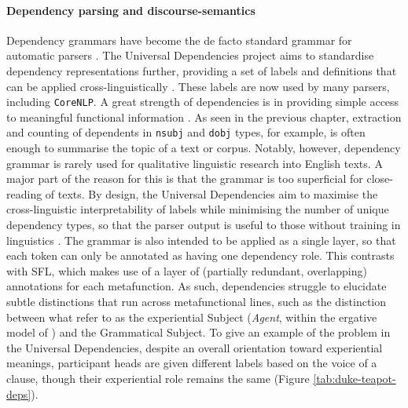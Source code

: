 \paragraph{Dependency parsing and discourse-semantics}

Dependency grammars have become the de facto standard grammar for automatic parsers \cite{marneffe_ud_2014}. The Universal Dependencies project aims to standardise dependency representations further, providing a set of labels and definitions that can be applied cross-linguistically \cite{nivre_towards_2015}. These labels are now used by many parsers, including \texttt{CoreNLP}. A great strength of dependencies is in providing simple access to meaningful functional information \cite{de2008stanford}. As seen in the previous chapter, extraction and counting of dependents in \texttt{nsubj} and \texttt{dobj} types, for example, is often enough to summarise the topic of a text or \gls{corpus}. Notably, however, dependency grammar is rarely used for qualitative linguistic research into English texts. A major part of the reason for this is that the grammar is too superficial for close\hyp{}reading of texts. By design, the Universal Dependencies aim to maximise the cross\hyp{}linguistic interpretability of labels while minimising the number of unique dependency types, so that the parser output is useful to those without training in linguistics \cite{marneffe_ud_2014}. The grammar is also intended to be applied as a single layer, so that each token can only be annotated as having one dependency role. This contrasts with \gls{SFL}, which makes use of a layer of (partially redundant, overlapping) annotations for each metafunction. As such, dependencies struggle to elucidate subtle distinctions that run across metafunctional lines, such as the distinction between what \textcite{halliday_introduction_2004} refer to as the experiential Subject (\emph{Agent}, within the ergative model of ) and the Grammatical Subject. To give an example of the problem \cite[using a classic example from the IFG: ][pp.~53--58]{halliday_introduction_2004} in the Universal Dependencies, despite an overall orientation toward experiential meanings, participant heads are given different labels based on the voice of a clause, though their experiential role remains the same (Figure \ref{tab:duke-teapot-deps}).

